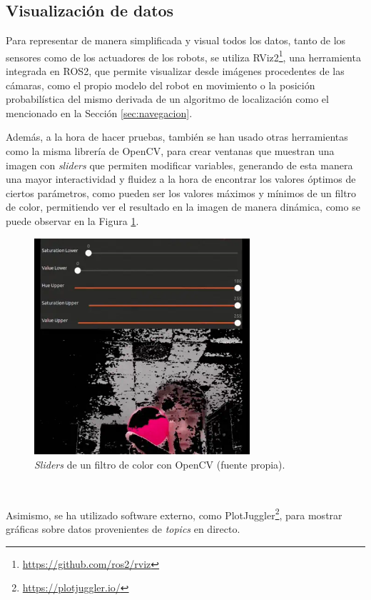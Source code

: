 \subsection{Visualización de datos}
\label{sec:visualizacion_datos}

Para representar de manera simplificada y visual todos los datos, tanto de los
sensores como de los actuadores de los robots, se utiliza
RViz2\footnote{\url{https://github.com/ros2/rviz}}, una herramienta integrada en
ROS2, que permite visualizar desde imágenes procedentes de las cámaras, como el
propio modelo del robot en movimiento o la posición probabilística del mismo
derivada de un algoritmo de localización como el mencionado en la Sección
\ref{sec:navegacion}.

Además, a la hora de hacer pruebas, también se han usado otras herramientas como
la misma librería de OpenCV, para crear ventanas que muestran una imagen con
\textit{sliders} que permiten modificar variables, generando de esta manera una
mayor interactividad y fluidez a la hora de encontrar los valores óptimos de
ciertos parámetros, como pueden ser los valores máximos y mínimos de un filtro
de color, permitiendo ver el resultado en la imagen de manera dinámica, como se
puede observar en la Figura \ref{fig:opencv}.

\begin{figure} [h!]
  \begin{center}
    \includegraphics[width=8cm]{figs/opencv_visualization}
  \end{center}
  \caption{\textit{Sliders} de un filtro de color con OpenCV (fuente propia).}
  \label{fig:opencv}
\end{figure}\

Asimismo, se ha utilizado software externo, como
PlotJuggler\footnote{\url{https://plotjuggler.io/}}, para mostrar gráficas sobre
datos provenientes de \textit{topics} en directo.


